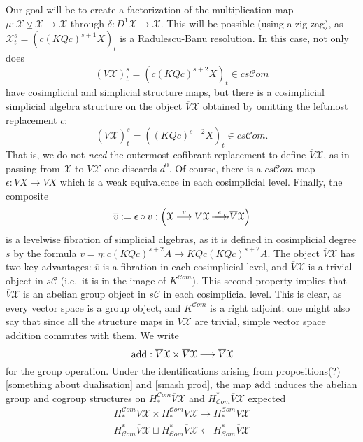\documentclass[11pt]{amsart}
\theoremstyle{plain}
\theoremstyle{definition}
\renewcommand{\to}{\longrightarrow}
\newcommand{\from}{\longleftarrow}
\newcommand{\scrC}{\mathscr{C}}
\newcommand{\calX}{\mathcal{X}}
\newcommand{\calC}{\mathcal{C}}
\newcommand{\calc}{\mathcal{C}}
\theoremstyle{plain}
\newcommand{\epi}{{\,\makebox[0cm][l]{\ensuremath\to}\to}}
\newcommand{\algs}{{\scrC\!\textit{om}}}
\newcommand{\smashcoprod}{\veebar}%
\begin{document}
\begin{Operations on the Bousfield-Kan spectral sequence}
Our goal will be to create a factorization of the multiplication map $\mu:\calX \smashcoprod  \calX \to \calX $ through $\delta:D^1\calX \to \calX $. This will be possible (using a zig-zag), as $\calX^s_t=(c(KQc)^{s+1}X)_t$ is a  Radulescu-Banu resolution. In this case, not only does
\[(V\calX)^s_t=(c(KQc)^{s+2}X)_t\in cs\algs\]
have cosimplicial and simplicial structure maps,
but there is a cosimplicial simplicial algebra structure on the object $\overline{V}\calX$ obtained by omitting the leftmost replacement $c$:
\[(\overline{V}\calX)^s_t=((KQc)^{s+2}X)_t\in cs\algs.\]
That is, we do not \emph{need} the outermost cofibrant replacement to define $\overline{V}\calX$, as in passing from $\calX$ to $V\calX$ one discards $d^0$. Of course, there is a $cs\algs$-map $\epsilon:VX\to \overline{V}X$ which is a weak equivalence in each cosimplicial level. Finally, the composite
\[\overline{v}:=\epsilon\circ v:\left(\calX\overset{v}{\to}V\calX\overset{\epsilon}{\epi} \overline{V}\calX\right)\]
is a levelwise fibration of simplicial algebras, as it is defined in cosimplicial degree $s$ by the formula $\overline{v}=\eta:c(KQc)^{s+2}A\to KQc(KQc)^{s+2}A$. The object $\overline{V}\calX$ has two key advantages: $\overline{v}$ is a fibration in each cosimplicial level, and $\overline{V}\calX$ is a trivial object in $s\calC$ (i.e.\ it is in the image of $K^{\algs}$). This second property implies that  $\overline{V}\calX$ is an abelian group object in $s\calc$ in each cosimplicial level. This is clear, as every vector space is a group object, and $K^{\algs}$ is a right adjoint; one might also say that since all the structure maps in $\overline{V}\calX$ are trivial, simple vector space addition commutes with them. We write
\[\textup{add}:\overline{V}\calX\times \overline{V}\calX\to \overline{V}\calX\]
for the group operation. Under the identifications arising from propositions(?) \ref{something about dualisation} and \ref{smash prod}, the map $\textup{add}$ induces the abelian group and cogroup structures on $H_*^\algs\overline{V}\calX$ and $H^*_\algs\overline{V}\calX$ expected
\begin{gather*}
H_*^\algs\overline{V}\calX\times H_*^\algs\overline{V}\calX\to H_*^\algs\overline{V}\calX\\
H^*_\algs\overline{V}\calX\sqcup H^*_\algs\overline{V}\calX\from H^*_\algs\overline{V}\calX
\end{gather*}


\end{Operations on the Bousfield-Kan spectral sequence}
\end{document}

